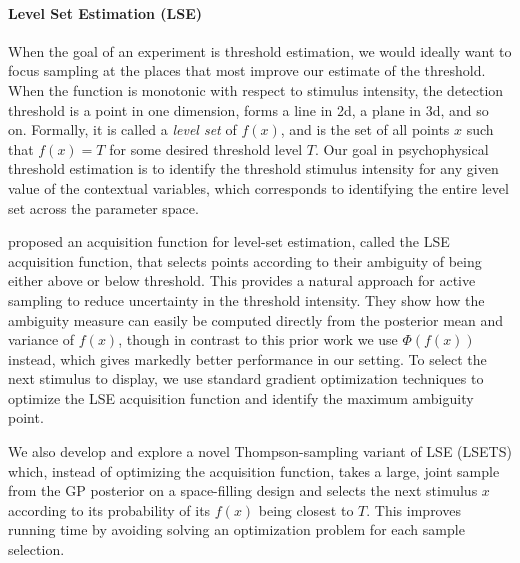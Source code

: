 \documentclass[../main.tex]{subfiles}
\begin{document}
\paragraph{Level Set Estimation (LSE)}
When the goal of an experiment is threshold estimation, we would ideally want to focus sampling at the places that most improve our estimate of the threshold. When the function is monotonic with respect to stimulus intensity, the detection threshold is a point in one dimension, forms a line in 2d, a plane in 3d, and so on. Formally, it is called a \emph{level set} of $f(x)$, and is the set of all points $x$ such that $f(x)=T$ for some desired threshold level $T$. Our goal in psychophysical threshold estimation is to identify the threshold stimulus intensity for any given value of the contextual variables, which corresponds to identifying the entire level set across the parameter space.

\citet{Gotovos2013} proposed an acquisition function for level-set estimation, called the LSE acquisition function, that selects points according to their ambiguity of being either above or below threshold. This provides a natural approach for active sampling to reduce uncertainty in the threshold intensity. They show how the ambiguity measure can easily be computed directly from the posterior mean and variance of $f(x)$, though in contrast to this prior work we use $\Phi(f(x))$ instead, which gives markedly better performance in our setting. To select the next stimulus to display, we use standard gradient optimization techniques to optimize the LSE acquisition function and identify the maximum ambiguity point.

We also develop and explore a novel Thompson-sampling variant of LSE (LSETS) which, instead of optimizing the acquisition function, takes a large, joint sample from the GP posterior on a space-filling design and selects the next stimulus $x$ according to its probability of its $f(x)$ being closest to $T$. This improves running time by avoiding solving an optimization problem for each sample selection.
\end{document}
